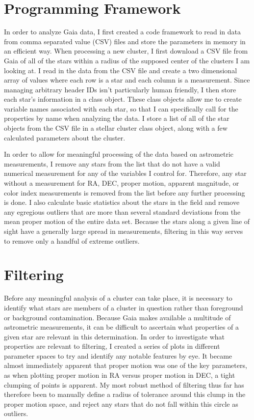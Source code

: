 \documentclass[aps,prb,twocolumn,groupedaddress,nofootinbib,floatfix]{revtex4-1}
\begin{document}
\section*{Programming Framework}
In order to analyze Gaia data, I first created a code framework to read in data from comma separated value (CSV) files and store the parameters in memory in an efficient way. When processing a new cluster, I first download a CSV file from Gaia of all of the stars within a radius of the supposed center of the clusters I am looking at. I read in the data from the CSV file and create a two dimensional array of values where each row is a star and each column is a measurement. Since managing arbitrary header IDs isn't particularly human friendly, I then store each star's information in a class object. These class objects allow me to create variable names associated with each star, so that I can specifically call for the properties by name when analyzing the data. I store a list of all of the star objects from the CSV file in a stellar cluster class object, along with a few calculated parameters about the cluster.

In order to allow for meaningful processing of the data based on astrometric measurements, I remove any stars from the list that do not have a valid numerical measurement for any of the variables I control for. Therefore, any star without a measurement for RA, DEC, proper motion, apparent magnitude, or color index measurements is removed from the list before any further processing is done. I also calculate basic statistics about the stars in the field and remove any egregious outliers that are more than several standard deviations from the mean proper motion of the entire data set. Because the stars along a given line of sight have a generally large spread in measurements, filtering in this way serves to remove only a handful of extreme outliers.


\section*{Filtering}
Before any meaningful analysis of a cluster can take place, it is necessary to identify what stars are members of a cluster in question rather than foreground or background contamination. Because Gaia makes available a multitude of astrometric measurements, it can be difficult to ascertain what properties of a given star are relevant in this determination. In order to investigate what properties are relevant to filtering, I created a series of plots in different parameter spaces to try and identify any notable features by eye. It became almost immediately apparent that proper motion was one of the key parameters, as when plotting proper motion in RA versus proper motion in DEC, a tight clumping of points is apparent. My most robust method of filtering thus far has therefore been to manually define a radius of tolerance around this clump in the proper motion space, and reject any stars that do not fall within this circle as outliers.
\end{document}
